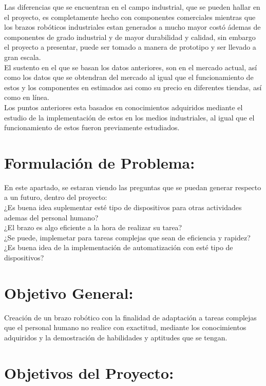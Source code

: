 \documentclass[14pt,a4paper]{article}
\begin{document}
Las diferencias que se encuentran en el campo industrial, que se pueden hallar en el proyecto, es completamente hecho con componentes comerciales mientras que los brazos robóticos industriales estan generados a mucho mayor costó ádemas de componentes de grado industrial y de mayor durabilidad y calidad, sin embargo el proyecto a presentar, puede ser tomado a manera de prototipo y ser llevado a gran escala.\\
El sustento en el que se basan los datos anteriores, son en el mercado actual, así como los datos que se obtendran del mercado al igual que el funcionamiento de estos y los componentes en estimados asi como su precio en diferentes tiendas, así como en línea.\\
Los puntos anteriores esta basados en conocimientos adquiridos mediante el estudio de la implementación de estos en los medios industriales, al igual que el funcionamiento de estos fueron previamente estudiados.

\section{Formulación de Problema:}

En este apartado, se estaran viendo las preguntas que se puedan generar respecto a un futuro, dentro del proyecto:\\

¿Es buena idea suplementar esté tipo de dispositivos para otras actividades ademas del personal humano?\\
¿El brazo es algo eficiente a la hora de realizar su tarea?\\
¿Se puede, implemetar para tareas complejas que sean de eficiencia y rapidez?\\
¿Es buena idea de la implementación de automatización con esté tipo de dispositivos? 

\section{Objetivo General:}

Creación de un brazo robótico con la finalidad de adaptación a tareas complejas que el personal humano no realice con exactitud, mediante los conocimientos adquiridos y la demostración de habilidades y aptitudes que se tengan. 

\section{Objetivos del Proyecto:}
\end{document}
